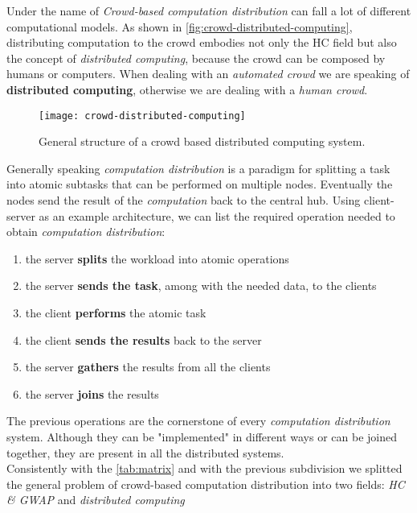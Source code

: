 

Under the name of \emph{Crowd-based computation distribution} can fall a lot of
different computational models. As shown in
\autoref{fig:crowd-distributed-computing}, distributing computation to the crowd
embodies not only the \ac{HC} field but also the concept of \emph{distributed
computing}, because the crowd can be composed by humans or computers. When dealing
with an \emph{automated crowd} we are speaking of \textbf{distributed computing},
otherwise we are dealing with a \emph{human crowd}.
\begin{figure}[htb]
    \centering
    \texttt{[image: crowd-distributed-computing]}
    \caption{General structure of a crowd based distributed computing system.}
    \label{fig:crowd-distributed-computing}
\end{figure}

Generally speaking \emph{computation distribution} is a paradigm for splitting
a task into atomic subtasks that can be performed on multiple nodes. Eventually
the nodes send the result of the \emph{computation} back to the central hub.
Using client-server as an example architecture, we can list the required
operation needed to obtain \emph{computation distribution}:
\begin{enumerate}
    \item the server \textbf{splits} the workload into atomic operations
    \item the server \textbf{sends the task}, among with the needed data, to the
    clients
    \item the client \textbf{performs} the atomic task
    \item the client \textbf{sends the results} back to the server
    \item the server \textbf{gathers} the results from all the clients
    \item the server \textbf{joins} the results
\end{enumerate}
The previous operations are the cornerstone of every \emph{computation
distribution} system. Although they can be "implemented" in different ways or can
be joined together, they are present in all the distributed systems.\\

Consistently with the \autoref{tab:matrix} and with the previous subdivision we
splitted the general problem of crowd-based computation distribution into two
fields: \emph{\acl{HC} \& \acl{GWAP}} and \emph{distributed computing}

